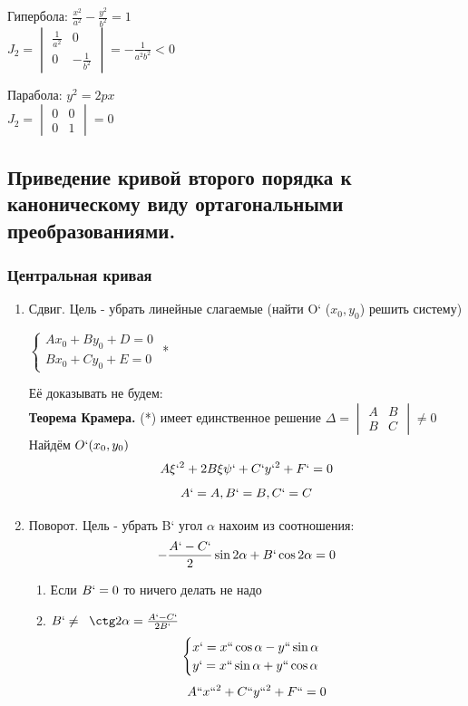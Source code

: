 \documentclass[12pt, a4paper]{article}
\begin{document}
Гипербола: $\frac{x^2}{a^2} - \frac{y^2}{b^2} = 1$\\
$ J_2 = \begin{vmatrix}
	\frac{1}{a^2} & 0\\
	0 & -\frac{1}{b^2}
\end{vmatrix} = -\frac{1}{a^2b^2} < 0$

Парабола: $y^2 = 2px$\\
$ J_2 = \begin{vmatrix}
	0 & 0\\
	0 & 1
\end{vmatrix} = 0$

\subsection{Приведение кривой второго порядка к каноническому виду ортагональными преобразованиями. }
\subsubsection{Центральная кривая}
\begin{enumerate}
	\item Сдвиг. Цель - убрать линейные слагаемые (найти O` ($x_0, y_0$) решить систему) 
	\begin{center}
	$ 
	\begin{cases}
		Ax_0 + By_0 + D = 0\\
		Bx_0 + Cy_0 + E = 0
	\end{cases}$                      * 
	\end{center}

	Её доказывать не будем:\\
	\textbf{Теорема Крамера.} (*) имеет единственное решение $\Delta = \begin{vmatrix}
	A&B\\
	B&C
	\end{vmatrix} \not= 0$
	Найдём $O` (x_0, y_0)$ 
	\[ A\xi`^2 + 2B\xi\psi` + C`y`^2 + F` = 0 \]
	\[ A` = A, B` = B, C` = C \]

	\item Поворот. Цель - убрать B` угол $\alpha$ нахоим из соотношения:
		\[ -\frac{A`-C`}{2} \sin 2\alpha + B` \cos 2 \alpha = 0 \]
		\begin{enumerate}
			\item Если $B` = 0$ то ничего делать не надо
			\item $B` \not =\;\; \ctg 2\alpha = \frac{A` - C`}{2B`}$
				\[ \begin{cases}
				x` = x`` \cos \alpha - y`` \sin \alpha \\
				y` = x`` \sin \alpha + y`` \cos \alpha 
				\end{cases}\]
				\[ A``x``^2 + C``y``^2 + F`` = 0 \]
		\end{enumerate}
\end{enumerate}
\end{document}
